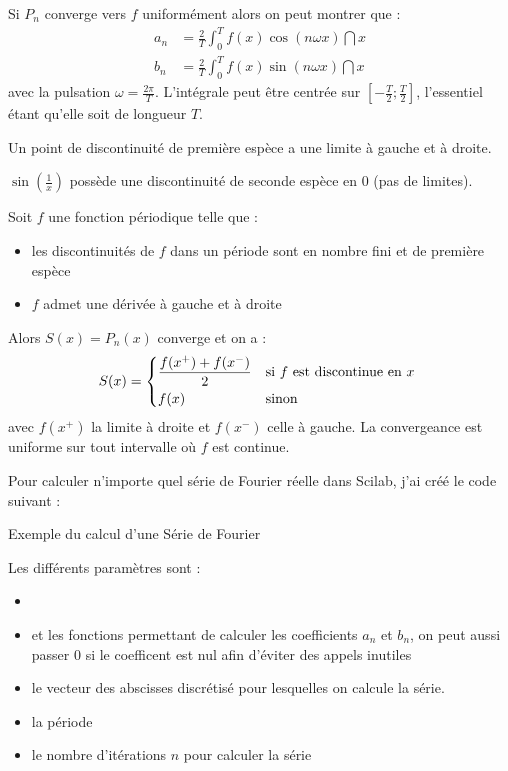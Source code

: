 	Si $P_n$ converge vers $f$ uniformément alors on peut montrer que :
	\begin{align*}
		a_n &= \frac{2}{T} \int_0^T f(x)\cos(n\omega x) \dint{x}		\\
		b_n &= \frac{2}{T} \int_0^T f(x)\sin(n\omega x) \dint{x}
	\end{align*}
	avec la pulsation $\omega = \frac{2\pi}{T}$. L'intégrale peut être centrée sur $[-\frac{T}{2}; \frac{T}{2}]$, l'essentiel étant qu'elle soit de longueur $T$.

	\begin{definitionShort}
		Un point de discontinuité de première espèce a une limite à gauche et à droite.
	\end{definitionShort}
	$\sin(\frac{1}{x})$ possède une discontinuité de seconde espèce en $0$ (pas de limites).

	\begin{theoreme}
		\label{th-6-dirichlet}
		Soit $f$ une fonction périodique telle que :
		\begin{itemize}
			\item les discontinuités de $f$ dans un période sont en nombre fini et de première espèce
			\item $f$ admet une dérivée à gauche et à droite
		\end{itemize}
		Alors $S(x) = P_n(x)$ converge et on a :
		\begin{equation}
			S(x) = \begin{dcases*}
				\frac{f(x^+) + f(x^-)}{2}	& si $f$ est discontinue en $x$	\\
				f(x)						& sinon
			\end{dcases*}
		\end{equation}
		avec $f(x^+)$ la limite à droite et $f(x^-)$ celle à gauche.
		La convergeance est uniforme sur tout intervalle où $f$ est continue.
	\end{theoreme}


	Pour calculer n'importe quel série de Fourier réelle dans Scilab, j'ai créé le code suivant :

	\begin{listing}[H]
		\caption{Exemple du calcul d'une Série de Fourier}
		\label{code-6-calculSerie}
	\end{listing}

	Les différents paramètres sont :
	\begin{itemize}
		\item {} 
		\item {} et  les fonctions permettant de calculer les coefficients $a_n$ et $b_n$, on peut aussi passer $0$ si le coefficent est nul afin d'éviter des appels inutiles
		\item {} le vecteur des abscisses discrétisé pour lesquelles on calcule la série.
		\item {} la période
		\item {}	le nombre d'itérations $n$ pour calculer la série
	\end{itemize}

